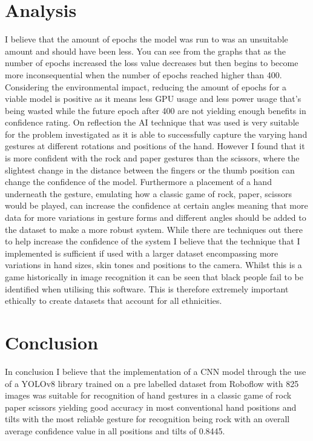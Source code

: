 \documentclass[conference]{IEEEtran}
\begin{document}
\section{Analysis}

I believe that the amount of epochs the model was run to was an unsuitable amount and should have been less. You can see from the graphs that as the number of epochs increased the loss value decreases but then begins to become more inconsequential when the number of epochs reached higher than 400. Considering the environmental impact, reducing the amount of epochs for a viable model is positive as it means less GPU usage and less power usage that's being wasted while the future epoch after 400 are not yielding enough benefits in confidence rating.
On reflection the AI technique that was used is very suitable for the problem investigated as it is able to successfully capture the varying hand gestures at different rotations and positions of the hand. However I found that it is more confident with the rock and paper gestures than the scissors, where the slightest change in the distance between the fingers or the thumb position can change the confidence of the model. Furthermore a placement of a hand underneath the gesture, emulating how a classic game of rock, paper, scissors would be played, can increase the confidence at certain angles meaning that more data for more variations in gesture forms and different angles should be added to the dataset to make a more robust system.
While there are techniques out there to help increase the confidence of the system I believe that the technique that I implemented is sufficient if used with a larger dataset encompassing more variations in hand sizes, skin tones and positions to the camera. Whilst this is a game historically in image recognition it can be seen that black people fail to be identified when utilising this software. This is therefore extremely important ethically to create datasets that account for all ethnicities. \cite{algorithmic:racism}


\section{Conclusion}

In conclusion I believe that the implementation of a CNN model through the use of a YOLOv8 library trained on a pre labelled dataset from Roboflow with 825 images was suitable for recognition of hand gestures in a classic game of rock paper scissors yielding good accuracy in most conventional hand positions and tilts with the most reliable gesture for recognition being rock with an overall average confidence value in all positions and tilts of 0.8445.
\end{document}
